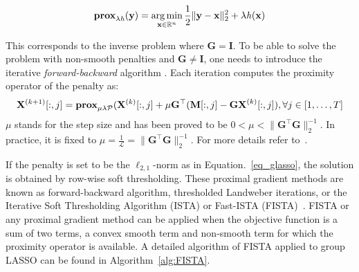 \begin{equation}
\textbf{prox}_{\lambda\mathit{h}}(\mathbf{y})=\mathop{\mathrm{arg}\,\mathrm{min}}_{\mathbf{x}\in\mathbb{R}^n}\frac{1}{2}\|\mathbf{y}-\mathbf{x}\|_2^2+\lambda\mathit{h}(\mathbf{x})
\end{equation}

This corresponds to the inverse problem where $\mathbf{G}=\mathbf{I}$. To be able to solve the problem with non-smooth penalties and $\mathbf{G}\neq\mathbf{I}$, one needs to introduce the iterative \textit{forward-backward} algorithm \cite{moreau1965proximite}. Each iteration computes the proximity operator of the penalty as:
\begin{equation}
\mathbf{X}^{(k+1)}[:,j]=\textbf{prox}_{\mu\lambda\mathcal{P}}(\mathbf{X}^{(k)}[:,j]+\mu\mathbf{G}^\top(\mathbf{M}[:,j]-\mathbf{GX}^{(k)}[:,j]), \forall j\in [1,\dots ,T]
\end{equation}
$\mu$ stands for the step size and has been proved to be $0<\mu<\|\mathbf{G}^\top\mathbf{G}\|_2^{-1}$. In practice, it is fixed to $\mu=\frac{1}{\mathcal{L}}=
 \|\mathbf{G}^\top\mathbf{G}\|_2^{-1}$. For more details refer to~\cite{moreau1965proximite,combettes2005signal,daubechies2004iterative}.

If the penalty is set to be the $\ell_{2,1}$-norm as in Equation.~\eqref{eq_glasso}, the solution is obtained by row-wise soft thresholding. These proximal gradient methods are known as forward-backward algorithm, thresholded Landweber iterations, or the Iterative Soft Thresholding Algorithm (ISTA) or Fast-ISTA (FISTA)~\cite{bach-etal:2012,parikh2014proximal}. FISTA or any proximal gradient method can be applied when the objective function is a sum of two terms, a convex smooth term and non-smooth term for which the proximity operator is available.
A detailed algorithm of FISTA applied to group LASSO can be found in Algorithm~\ref{alg:FISTA}. 

